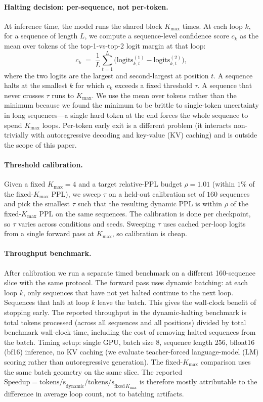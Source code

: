 \paragraph{Halting decision: per-sequence, not per-token.}
At inference time, the model runs the shared block $K_{\max}$ times.
At each loop $k$, for a sequence of length $L$, we compute a sequence-level confidence score $c_k$ as the mean over tokens of the top-1-vs-top-2 logit margin at that loop:
\begin{equation}
    c_k \;=\; \frac{1}{L}\sum_{t=1}^{L} \bigl(\mathrm{logits}^{(1)}_{k,t} - \mathrm{logits}^{(2)}_{k,t}\bigr),
\end{equation}
where the two logits are the largest and second-largest at position $t$.
A sequence halts at the smallest $k$ for which $c_k$ exceeds a fixed threshold $\tau$.
A sequence that never crosses $\tau$ runs to $K_{\max}$.
We use the mean over tokens rather than the minimum because we found the minimum to be brittle to single-token uncertainty in long sequences---a single hard token at the end forces the whole sequence to spend $K_{\max}$ loops.
Per-token early exit is a different problem (it interacts non-trivially with autoregressive decoding and key-value (KV) caching) and is outside the scope of this paper.

\paragraph{Threshold calibration.}
Given a fixed $K_{\max}{=}4$ and a target relative-PPL budget $\rho{=}1.01$ (within $1\%$ of the fixed-$K_{\max}$ PPL), we sweep $\tau$ on a held-out calibration set of $160$ sequences and pick the smallest $\tau$ such that the resulting dynamic PPL is within $\rho$ of the fixed-$K_{\max}$ PPL on the same sequences.
The calibration is done per checkpoint, so $\tau$ varies across conditions and seeds.
Sweeping $\tau$ uses cached per-loop logits from a single forward pass at $K_{\max}$, so calibration is cheap.

\paragraph{Throughput benchmark.}
After calibration we run a separate timed benchmark on a different 160-sequence slice with the same protocol.
The forward pass uses dynamic batching: at each loop $k$, only sequences that have not yet halted continue to the next loop.
Sequences that halt at loop $k$ leave the batch.
This gives the wall-clock benefit of stopping early.
The reported throughput in the dynamic-halting benchmark is total tokens processed (across all sequences and all positions) divided by total benchmark wall-clock time, including the cost of removing halted sequences from the batch.
Timing setup: single GPU, batch size 8, sequence length 256, bfloat16 (bf16) inference, no KV caching (we evaluate teacher-forced language-model (LM) scoring rather than autoregressive generation).
The fixed-$K_{\max}$ comparison uses the same batch geometry on the same slice.
The reported $\mathrm{Speedup}=\mathrm{tokens/s}_{\mathrm{dynamic}}/\mathrm{tokens/s}_{\mathrm{fixed}\,K_{\max}}$ is therefore mostly attributable to the difference in average loop count, not to batching artifacts.

